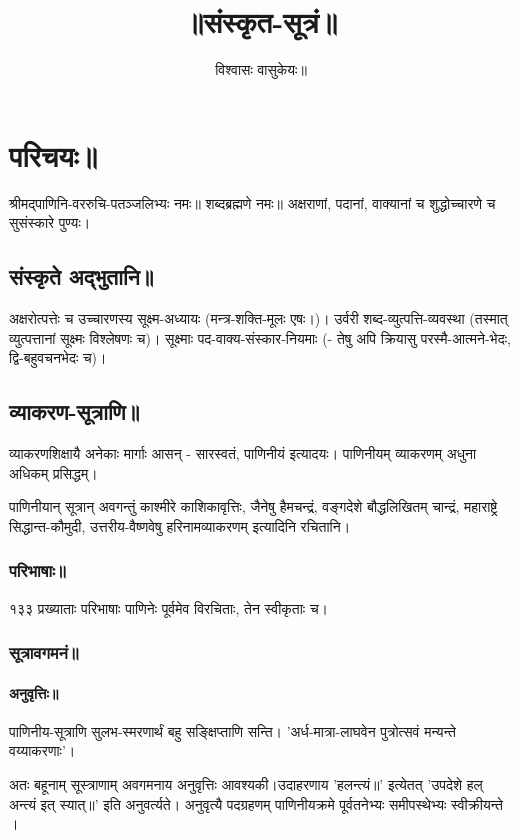 \documentclass[oneside, article]{memoir}
\title{॥संस्कृत-सूत्रं॥}
\author{विश्वासः वासुकेयः॥}
\begin{document}
\maketitle

\part{परिचयः॥}
श्रीमद्पाणिनि-वररुचि-पतञ्जलिभ्यः नमः॥ शब्दब्रह्मणे नमः॥ अक्षराणां, पदानां, वाक्यानां च शुद्धोच्चारणे च सुसंस्कारे पुण्यः।

\chapter{संस्कृते अद्भुतानि॥}
अक्षरोत्पत्तेः च उच्चारणस्य सूक्ष्म-अध्यायः (मन्त्र-शक्ति-मूलः एषः।)। उर्वरी शब्द-व्युत्पत्ति-व्यवस्था (तस्मात् व्युत्पत्तानां सूक्ष्मः विश्लेषणः च)। सूक्ष्माः पद-वाक्य-संस्कार-नियमाः (- तेषु अपि क्रियासु परस्मै-आत्मने-भेदः, द्वि-बहुवचनभेदः च)।

\chapter{व्याकरण-सूत्राणि॥}
व्याकरणशिक्षायै अनेकाः मार्गाः आसन् - सारस्वतं, पाणिनीयं इत्यादयः। पाणिनीयम् व्याकरणम् अधुना अधिकम् प्रसिद्धम्।

पाणिनीयान् सूत्रान् अवगन्तुं‌ काश्मीरे काशिकावृत्तिः, जैनेषु हैमचन्द्रं, वङ्गदेशे बौद्धलिखितम् चान्द्रं, महाराष्ट्रे सिद्धान्त-कौमुदी, उत्तरीय-वैष्णवेषु हरिनामव्याकरणम् इत्यादिनि रचितानि।

\section{परिभाषाः॥}
१३३ प्रख्याताः परिभाषाः पाणिनेः पूर्वमेव विरचिताः, तेन स्वीकृताः च। 

\section{सूत्रावगमनं॥}
\subsection{अनुवृत्तिः॥}
पाणिनीय-सूत्राणि सुलभ-स्मरणार्थं बहु सङ्क्षिप्ताणि सन्ति। 'अर्ध-मात्रा-लाघवेन पुत्रोत्सवं मन्यन्ते वय्याकरणाः'।

अतः बहूनाम् सूस्त्राणाम् अवगमनाय अनुवृत्तिः आवश्यकी।उदाहरणाय 'हलन्त्यं॥' इत्येतत् 'उपदेशे हल् अन्त्यं इत् स्यात्॥' इति अनुवर्त्यते। अनुवृत्यै पदग्रहणम् पाणिनीयक्रमे पूर्वतनेभ्यः समीपस्थेभ्यः स्वीक्रीयन्ते ।
\end{document}
